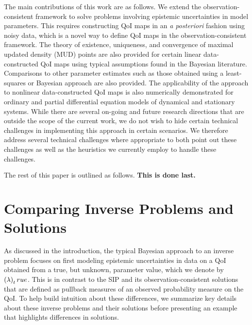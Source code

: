 The main contributions of this work are as follows.
We extend the observation-consistent framework to solve problems involving epistemic uncertainties in model parameters.
This requires constructing QoI maps in an {\em a posteriori} fashion using noisy data, which is a novel way to define QoI maps in the observation-consistent framework.
The theory of existence, uniqueness, and convergence of maximal updated density (MUD) points are also provided for certain linear data-constructed QoI maps using typical assumptions found in the Bayesian literature.
Comparisons to other parameter estimates such as those obtained using a least-squares or Bayesian approach are also provided.
The applicability of the approach to nonlinear data-constructed QoI maps is also numerically demonstrated for ordinary and partial differential equation models of dynamical and stationary systems.
While there are several on-going and future research directions that are outside the scope of the current work, we do not wish to hide certain technical challenges in implementing this approach in certain scenarios.
We therefore address several technical challenges where appropriate to both point out these challenges as well as the heuristics we currently employ to handle these challenges.


The rest of this paper is outlined as follows.
{\bf This is done last.}



\section{Comparing Inverse Problems and Solutions}\label{sec:compare}

As discussed in the introduction, the typical Bayesian approach to an inverse problem focuses on first modeling epistemic uncertainties in data on a QoI obtained from a true, but unknown, parameter value, which we denote by $\left ( \lambda \right )_true$.
This is in contrast to the SIP and its observation-consistent solutions that are defined as pullback measures of an observed probability measure on the QoI.
To help build intuition about these differences, we summarize key details about these inverse problems and their solutions before presenting an example that highlights differences in solutions.

